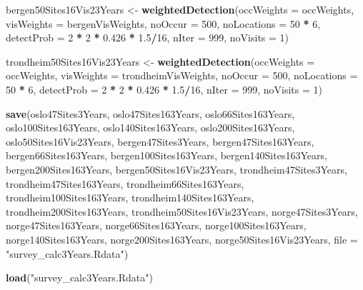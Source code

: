\documentclass[]{article}
\newenvironment{Shaded}{\begin{snugshade}}{\end{snugshade}}
\newcommand{\KeywordTok}[1]{\textcolor[rgb]{0.13,0.29,0.53}{\textbf{#1}}}
\newcommand{\DataTypeTok}[1]{\textcolor[rgb]{0.13,0.29,0.53}{#1}}
\newcommand{\DecValTok}[1]{\textcolor[rgb]{0.00,0.00,0.81}{#1}}
\newcommand{\FloatTok}[1]{\textcolor[rgb]{0.00,0.00,0.81}{#1}}
\newcommand{\StringTok}[1]{\textcolor[rgb]{0.31,0.60,0.02}{#1}}
\newcommand{\OperatorTok}[1]{\textcolor[rgb]{0.81,0.36,0.00}{\textbf{#1}}}
\newcommand{\NormalTok}[1]{#1}
\begin{document}
\begin{Shaded}
\begin{Highlighting}[]
\NormalTok{bergen50Sites16Vis23Years <-}\StringTok{ }\KeywordTok{weightedDetection}\NormalTok{(}\DataTypeTok{occWeights =}\NormalTok{ occWeights, }\DataTypeTok{visWeights =}\NormalTok{ bergenVisWeights, }
    \DataTypeTok{noOccur =} \DecValTok{500}\NormalTok{, }\DataTypeTok{noLocations =} \DecValTok{50} \OperatorTok{*}\StringTok{ }\DecValTok{6}\NormalTok{, }\DataTypeTok{detectProb =} \DecValTok{2} \OperatorTok{*}\StringTok{ }\DecValTok{2} \OperatorTok{*}\StringTok{ }\FloatTok{0.426} \OperatorTok{*}\StringTok{ }\FloatTok{1.5}\OperatorTok{/}\DecValTok{16}\NormalTok{, }
    \DataTypeTok{nIter =} \DecValTok{999}\NormalTok{, }\DataTypeTok{noVisits =} \DecValTok{1}\NormalTok{)}


\NormalTok{trondheim50Sites16Vis23Years <-}\StringTok{ }\KeywordTok{weightedDetection}\NormalTok{(}\DataTypeTok{occWeights =}\NormalTok{ occWeights, }\DataTypeTok{visWeights =}\NormalTok{ trondheimVisWeights, }
    \DataTypeTok{noOccur =} \DecValTok{500}\NormalTok{, }\DataTypeTok{noLocations =} \DecValTok{50} \OperatorTok{*}\StringTok{ }\DecValTok{6}\NormalTok{, }\DataTypeTok{detectProb =} \DecValTok{2} \OperatorTok{*}\StringTok{ }\DecValTok{2} \OperatorTok{*}\StringTok{ }\FloatTok{0.426} \OperatorTok{*}\StringTok{ }\FloatTok{1.5}\OperatorTok{/}\DecValTok{16}\NormalTok{, }
    \DataTypeTok{nIter =} \DecValTok{999}\NormalTok{, }\DataTypeTok{noVisits =} \DecValTok{1}\NormalTok{)}


\KeywordTok{save}\NormalTok{(oslo47Sites3Years, oslo47Sites163Years, oslo66Sites163Years, oslo100Sites163Years, }
\NormalTok{    oslo140Sites163Years, oslo200Sites163Years, oslo50Sites16Vis23Years, bergen47Sites3Years, }
\NormalTok{    bergen47Sites163Years, bergen66Sites163Years, bergen100Sites163Years, bergen140Sites163Years, }
\NormalTok{    bergen200Sites163Years, bergen50Sites16Vis23Years, trondheim47Sites3Years, }
\NormalTok{    trondheim47Sites163Years, trondheim66Sites163Years, trondheim100Sites163Years, }
\NormalTok{    trondheim140Sites163Years, trondheim200Sites163Years, trondheim50Sites16Vis23Years, }
\NormalTok{    norge47Sites3Years, norge47Sites163Years, norge66Sites163Years, norge100Sites163Years, }
\NormalTok{    norge140Sites163Years, norge200Sites163Years, norge50Sites16Vis23Years, }
    \DataTypeTok{file =} \StringTok{"survey_calc3Years.Rdata"}\NormalTok{)}
\end{Highlighting}
\end{Shaded}

\begin{Shaded}
\begin{Highlighting}[]
\KeywordTok{load}\NormalTok{(}\StringTok{"survey_calc3Years.Rdata"}\NormalTok{)}
\end{Highlighting}
\end{Shaded}
\end{document}
